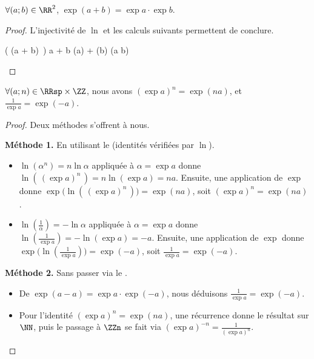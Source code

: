 \begin{fact}
    $\forall (a;b) \in \RR^2$,
    $\exp(a + b) = \exp a \cdot \exp b$.
\end{fact}


\begin{proof}
    L'injectivité de $\ln$ et les calculs suivants permettent de conclure.

    \begin{stepcalc}[style=ar*]
        \ln \big( \exp(a + b) \,\big)
        a + b
        \ln(\exp a) + \ln(\exp b)
        \ln(\exp a \cdot \exp b)
    \end{stepcalc}

    \null
    \vspace{-4ex}
\end{proof}




\begin{fact} \label{exp-id}
    $\forall (a;n) \in \RRsp \times \ZZ$,
    nous avons
    $(\exp a)^n = \exp(n a)$,
    et
    $\frac{1}{\exp a} = \exp(- a)$.
\end{fact}


\begin{proof}
    Deux méthodes s'offrent à nous.

    \smallskip
    \textbf{Méthode 1.} En utilisant le  (identités vérifiées par $\ln$).
    \begin{itemize}
        \item $\ln(\alpha^n) = n \ln \alpha$ appliquée à $\alpha = \exp a$ donne
        $\ln(\,(\exp a)^n\,) = n \ln(\exp a) = n a$.
        Ensuite,
        une application de $\exp$ donne
        $\exp\big( \ln(\,(\exp a)^n\,) \big) = \exp(n a)$,
        soit
        $(\exp a)^n = \exp(n a)$.


        \item $\ln(\frac{1}{\alpha}) = - \ln \alpha$ appliquée à $\alpha = \exp a$ donne
        $\ln(\frac{1}{\exp a}) = - \ln(\exp a) = - a$.
        Ensuite,
        une application de $\exp$ donne
        $\exp\big( \ln(\frac{1}{\exp a}) \big) = \exp(- a)$,
        soit
        $\frac{1}{\exp a} = \exp(- a)$.
    \end{itemize}


    \smallskip
    \textbf{Méthode 2.} Sans passer via le .
    \begin{itemize}
        \item De $\exp(a - a) = \exp a \cdot \exp(- a)$, nous déduisons $\frac{1}{\exp a} = \exp(- a)$.


        \item Pour l'identité $(\exp a)^n = \exp(n a)$, une récurrence donne le résultat sur $\NN$, puis le passage à $\ZZn$ se fait via $(\exp a)^{-n} = \frac{1}{(\exp a)^n}$.
    \end{itemize}

    \null
    \vspace{-5ex}
\end{proof}
